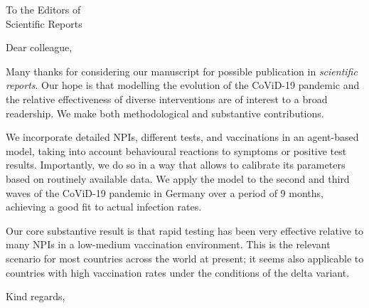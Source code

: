 \documentclass[USenglish, 10pt, UBonn_letterhead]{scrlttr2}
\begin{document}


\begin{letter}{%
        To the Editors of\\
        Scientific Reports \\
    }

    \opening{Dear colleague,}

    Many thanks for considering our manuscript for possible publication in
    \textit{scientific reports}. Our hope is that modelling the evolution of the
    CoViD-19 pandemic and the relative effectiveness of diverse interventions are of
    interest to a broad readership. We make both methodological and substantive
    contributions.

    We incorporate detailed NPIs, different tests, and vaccinations in an agent-based
    model, taking into account behavioural reactions to symptoms or positive test
    results. Importantly, we do so in a way that allows to calibrate its parameters
    based on routinely available data. We apply the model to the second and third waves
    of the CoViD-19 pandemic in Germany over a period of 9 months, achieving a good fit
    to actual infection rates.
    
    Our core substantive result is that rapid testing has been very effective relative
    to many NPIs in a low-medium vaccination environment. This is the relevant scenario
    for most countries across the world at present; it seems also applicable to countries
    with high vaccination rates under the conditions of the delta variant.

    \closing{Kind regards,}

\end{letter}
\end{document}
